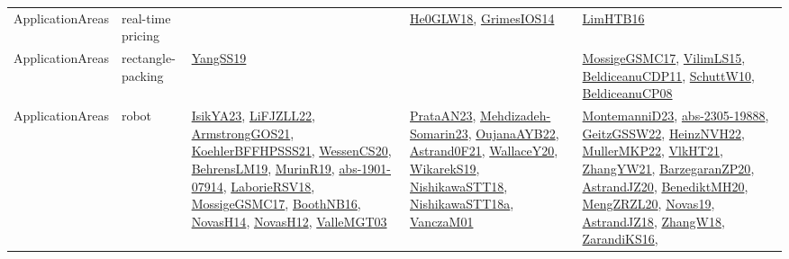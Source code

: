 {\begin{longtable}{lp{3cm}>{\raggedright}p{6cm}>{\raggedright}p{6cm}p{8cm}}
ApplicationAreas & real-time pricing &  & \href{papers/He0GLW18.pdf}{He0GLW18}\cite{He0GLW18}, \href{articles/GrimesIOS14.pdf}{GrimesIOS14}\cite{GrimesIOS14} & \href{papers/LimHTB16.pdf}{LimHTB16}\cite{LimHTB16}\\
ApplicationAreas & rectangle-packing & \href{papers/YangSS19.pdf}{YangSS19}\cite{YangSS19} &  & \href{papers/MossigeGSMC17.pdf}{MossigeGSMC17}\cite{MossigeGSMC17}, \href{papers/VilimLS15.pdf}{VilimLS15}\cite{VilimLS15}, \href{articles/BeldiceanuCDP11.pdf}{BeldiceanuCDP11}\cite{BeldiceanuCDP11}, \href{papers/SchuttW10.pdf}{SchuttW10}\cite{SchuttW10}, \href{papers/BeldiceanuCP08.pdf}{BeldiceanuCP08}\cite{BeldiceanuCP08}\\
ApplicationAreas & robot & \href{articles/IsikYA23.pdf}{IsikYA23}\cite{IsikYA23}, \href{papers/LiFJZLL22.pdf}{LiFJZLL22}\cite{LiFJZLL22}, \href{papers/ArmstrongGOS21.pdf}{ArmstrongGOS21}\cite{ArmstrongGOS21}, \href{articles/KoehlerBFFHPSSS21.pdf}{KoehlerBFFHPSSS21}\cite{KoehlerBFFHPSSS21}, \href{papers/WessenCS20.pdf}{WessenCS20}\cite{WessenCS20}, \href{papers/BehrensLM19.pdf}{BehrensLM19}\cite{BehrensLM19}, \href{papers/MurinR19.pdf}{MurinR19}\cite{MurinR19}, \href{articles/abs-1901-07914.pdf}{abs-1901-07914}\cite{abs-1901-07914}, \href{articles/LaborieRSV18.pdf}{LaborieRSV18}\cite{LaborieRSV18}, \href{papers/MossigeGSMC17.pdf}{MossigeGSMC17}\cite{MossigeGSMC17}, \href{papers/BoothNB16.pdf}{BoothNB16}\cite{BoothNB16}, \href{articles/NovasH14.pdf}{NovasH14}\cite{NovasH14}, \href{articles/NovasH12.pdf}{NovasH12}\cite{NovasH12}, \href{papers/ValleMGT03.pdf}{ValleMGT03}\cite{ValleMGT03} & \href{articles/PrataAN23.pdf}{PrataAN23}\cite{PrataAN23}, \href{papers/Mehdizadeh-Somarin23.pdf}{Mehdizadeh-Somarin23}\cite{Mehdizadeh-Somarin23}, \href{papers/OujanaAYB22.pdf}{OujanaAYB22}\cite{OujanaAYB22}, \href{papers/Astrand0F21.pdf}{Astrand0F21}\cite{Astrand0F21}, \href{articles/WallaceY20.pdf}{WallaceY20}\cite{WallaceY20}, \href{articles/WikarekS19.pdf}{WikarekS19}\cite{WikarekS19}, \href{papers/NishikawaSTT18.pdf}{NishikawaSTT18}\cite{NishikawaSTT18}, \href{papers/NishikawaSTT18a.pdf}{NishikawaSTT18a}\cite{NishikawaSTT18a}, \href{papers/VanczaM01.pdf}{VanczaM01}\cite{VanczaM01} & \href{articles/MontemanniD23.pdf}{MontemanniD23}\cite{MontemanniD23}, \href{articles/abs-2305-19888.pdf}{abs-2305-19888}\cite{abs-2305-19888}, \href{papers/GeitzGSSW22.pdf}{GeitzGSSW22}\cite{GeitzGSSW22}, \href{articles/HeinzNVH22.pdf}{HeinzNVH22}\cite{HeinzNVH22}, \href{articles/MullerMKP22.pdf}{MullerMKP22}\cite{MullerMKP22}, \href{articles/VlkHT21.pdf}{VlkHT21}\cite{VlkHT21}, \href{articles/ZhangYW21.pdf}{ZhangYW21}\cite{ZhangYW21}, \href{papers/BarzegaranZP20.pdf}{BarzegaranZP20}\cite{BarzegaranZP20}, \href{articles/AstrandJZ20.pdf}{AstrandJZ20}\cite{AstrandJZ20}, \href{articles/BenediktMH20.pdf}{BenediktMH20}\cite{BenediktMH20}, \href{articles/MengZRZL20.pdf}{MengZRZL20}\cite{MengZRZL20}, \href{articles/Novas19.pdf}{Novas19}\cite{Novas19}, \href{papers/AstrandJZ18.pdf}{AstrandJZ18}\cite{AstrandJZ18}, \href{articles/ZhangW18.pdf}{ZhangW18}\cite{ZhangW18}, \href{articles/ZarandiKS16.pdf}{ZarandiKS16}\cite{ZarandiKS16}, 
\end{longtable}}
